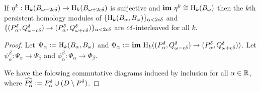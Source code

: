 \begin{lemma}
  If $\eta^k : \mathrm{H}_k(B_{\omega - 2c{\delta}})\to \mathrm{H}_k(B_{\omega + 2c{\delta}})$ is surjective and $\mathbf{im}~\eta^k\cong \mathrm{H}_k(B_\omega)$ then the $k$th persistent homology modules of $\{\mathrm{H}_k(B_\alpha, B_{\omega})\}_{\alpha < 2c{\delta}}$ and $\{(P^{{\delta}}_\alpha, Q_{\omega - c{\delta}}^\delta)\to (P^{{\delta}}_\alpha,Q_{\omega + c{\delta}}^\delta)\}_{\alpha < 2c{\delta}}$ are $c{\delta}$-interleaved for all $k$.
\end{lemma}
\begin{proof}
  Let $\Psi_\alpha := \mathrm{H}_k(B_\alpha, B_{\omega})$ and $\Phi_\alpha := \mathbf{im}~\mathrm{H}_k((P^{{\delta}}_\alpha, Q_{\omega - c{\delta}}^\delta)\to (P^{{\delta}}_\alpha,Q_{\omega + c{\delta}}^\delta))$.
  Let $\psi_\alpha^\beta : \Psi_\alpha\to \Psi_\beta$ and $\phi_\alpha^\beta : \Phi_\alpha\to \Phi_\beta$.

  We have the folowing commutative diagrams induced by inclusion for all $\alpha\in\mathbb{R}$, where $\widehat{P^{{\delta}}_\alpha} := P^{{\delta}}_\alpha\cup (D\setminus P^{{\delta}})$.


\end{proof}
